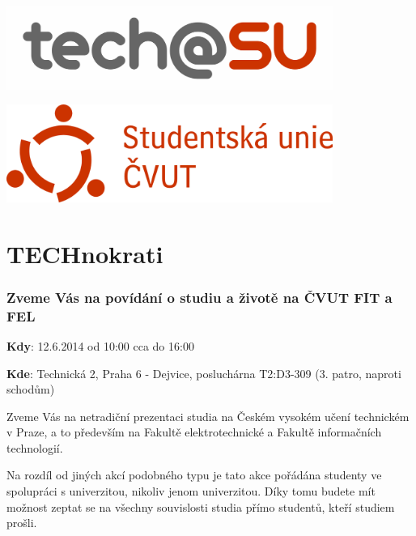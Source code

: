 \documentclass[12pt]{extarticle}[10.3.2013]
\author{Tomáš Kukrál}
\newcommand{\B}[1]{\textbf{{#1}}}
\begin{document}
\pagestyle{empty}

\begin{minipage}[c]{0.5\textwidth}
\begin{center}
	{\includegraphics[width=0.8\textwidth]{logo-obdelnik.png}}
\end{center}
\end{minipage}
\begin{minipage}[c]{0.5\textwidth}
\begin{center}
	{\includegraphics[width=0.8\textwidth]{logo-su.png}}
\end{center}
\end{minipage}

\part*{TECHnokrati}
\section*{Zveme Vás na povídání o studiu a životě na ČVUT FIT a FEL}

\B{Kdy}: 12.6.2014 od 10:00 cca do 16:00

\B{Kde}: Technická 2, Praha 6 - Dejvice, posluchárna T2:D3-309 (3. patro,
naproti schodům)



\vspace{1em}

Zveme Vás na netradiční prezentaci studia na Českém vysokém učení technickém v Praze, a to především na Fakultě elektrotechnické a Fakultě informačních technologií.

Na rozdíl od jiných akcí podobného typu je tato akce pořádána studenty
ve spolupráci s univerzitou, nikoliv jenom univerzitou. Díky tomu budete mít možnost zeptat se na všechny
souvislosti studia přímo studentů, kteří studiem prošli.
\end{document}
